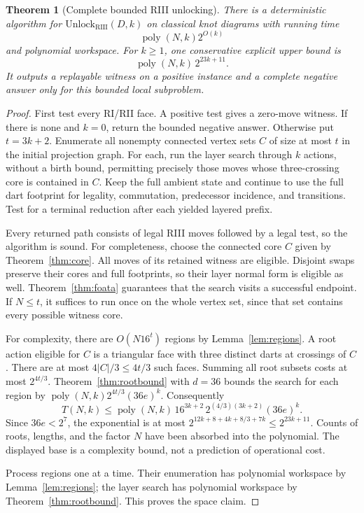 \documentclass[11pt]{article}
\newtheorem{theorem}{Theorem}[section]
\theoremstyle{definition}
\newcommand{\poly}{\operatorname{poly}}
\newcommand{\RIII}{\mathrm{RIII}}
\begin{document}
\begin{theorem}[Complete bounded RIII unlocking]
\label{thm:main}
There is a deterministic algorithm for
$\mathrm{Unlock}_{\RIII}(D,k)$ on classical knot diagrams with running time
\begin{equation}
 \poly(N,k)2^{O(k)}
 \label{eq:mainfpt}
\end{equation}
and polynomial workspace. For $k\ge1$, one conservative explicit
upper bound is
\begin{equation}
 \poly(N,k)\,2^{23k+11}.
 \label{eq:explicit}
\end{equation}
It outputs a replayable witness on a positive instance and a complete
negative answer only for this bounded local subproblem.
\end{theorem}

\begin{proof}
First test every RI/RII face. A positive test gives a zero-move witness.
If there is none and $k=0$, return the bounded negative answer. Otherwise
put $t=3k+2$. Enumerate all nonempty connected vertex sets $C$ of size
at most $t$ in the initial projection graph. For each, run the layer
search through $k$ actions, without a birth bound, permitting precisely
those moves whose three-crossing core is contained in $C$. Keep the full
ambient state and continue to use the full dart footprint for legality,
commutation, predecessor incidence, and transitions. Test for a terminal
reduction after each yielded layered prefix.

Every returned path consists of legal RIII moves followed by a legal
test, so the algorithm is sound. For completeness, choose the connected
core $C$ given by Theorem~\ref{thm:core}. All moves of its retained
witness are eligible. Disjoint swaps preserve their cores and full
footprints, so their layer normal form is eligible as well.
Theorem~\ref{thm:foata} guarantees that the search visits a successful
endpoint. If $N\le t$, it suffices to run once on the whole vertex set,
since that set contains every possible witness core.

For complexity, there are $O(N16^t)$ regions by
Lemma~\ref{lem:regions}. A root action eligible for $C$ is a triangular
face with three distinct darts at crossings of $C$. There are at most
$4|C|/3\le4t/3$ such faces. Summing all root subsets costs at most
$2^{4t/3}$. Theorem~\ref{thm:rootbound} with $d=36$ bounds the search
for each region by $\poly(N,k)2^{4t/3}(36e)^k$. Consequently
\begin{equation}
 T(N,k)\le\poly(N,k)\,16^{3k+2}\,
                   2^{(4/3)(3k+2)}(36e)^k.
 \label{eq:product}
\end{equation}
Since $36e<2^7$, the exponential is at most
$2^{12k+8+4k+8/3+7k}\le2^{23k+11}$. Counts of roots, lengths, and
the factor $N$ have been absorbed into the polynomial. The displayed
base is a complexity bound, not a prediction of operational cost.

Process regions one at a time. Their enumeration has polynomial
workspace by Lemma~\ref{lem:regions}; the layer search has polynomial
workspace by Theorem~\ref{thm:rootbound}. This proves the space claim.
\end{proof}
\end{document}
